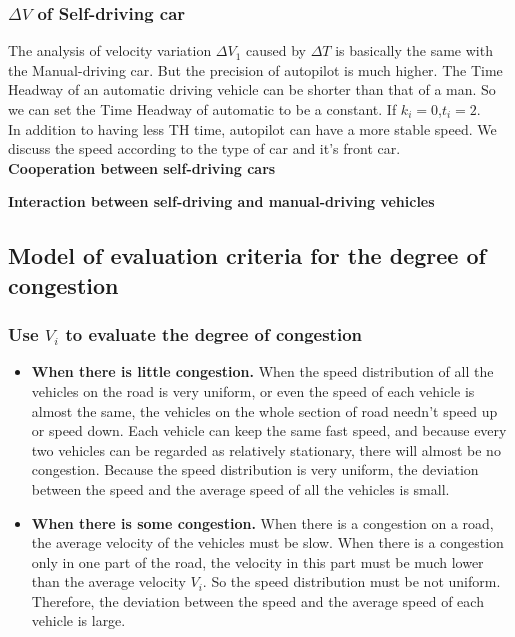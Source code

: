 \documentclass{mcmthesis}
\begin{document}
\subsubsection{$\Delta V$ of Self-driving car}
The analysis of velocity variation $\Delta V_{1}$ caused by $\Delta T$ is basically the same with the Manual-driving car. But the precision of autopilot is much higher. The Time Headway of an automatic driving vehicle can be shorter than that of a man. So we can set the Time Headway of automatic to be a constant. If $k_i=0$,$t_i=2$.\\
\indent In addition to having less TH time, autopilot can have a more stable speed. We discuss the speed according to the type of car and it's front car.\\

\textbf{Cooperation between self-driving cars \\}

\textbf{Interaction between self-driving and manual-driving vehicles \\}

\subsection{Model of evaluation criteria for the degree of congestion}
\label{evaluation criteria}
\subsubsection{Use $V_{i}$ to evaluate the degree of congestion}
\begin{itemize}
\item{\textbf{When there is little congestion.} \indent When the speed distribution of all the vehicles on the road is very uniform, or even the speed of each vehicle is almost the same, the vehicles on the whole section of road needn't speed up or speed down. Each vehicle can keep the same fast speed, and because every two vehicles can be regarded as relatively stationary, there will almost be no congestion. Because the speed distribution is very uniform, the deviation between the speed and the average speed of all the vehicles is small.}
\end{itemize}
\begin{itemize}
\item{\textbf{When there is some congestion.} When there is a congestion on a road, the average velocity of the vehicles must be slow. When there is a congestion only in one part of the road, the velocity in this part must be much lower than the average velocity $ V_{i} $. So the speed distribution must be not uniform. Therefore, the deviation between the speed and the average speed of each vehicle is large. }
\end{itemize}
\end{document}
